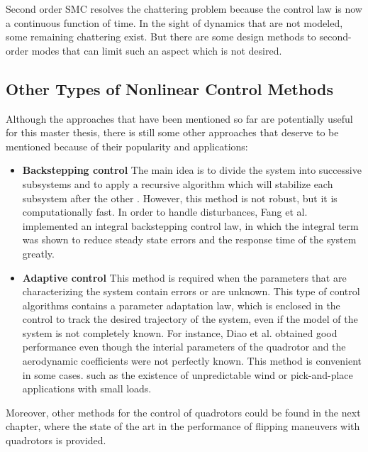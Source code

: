 \documentclass{thesisreport}
\begin{document}
\noindent Second order SMC resolves the chattering problem because the control law is now a continuous function of time. 
In the sight of dynamics that are not modeled, some remaining chattering exist. But there are some design methods to second-order modes that can limit such an aspect which is not desired.

\newpage

 \subsection{Other Types of Nonlinear Control Methods}
 
Although the approaches that have been mentioned so far are potentially useful for this master thesis, there is still some other approaches that deserve to be mentioned because of their popularity and applications:


\begin{itemize}
\setlength{\itemindent}{-.5in}
	\item [] \textbf{Backstepping control} The main idea is to divide the system into successive subsystems and to apply a recursive algorithm which will stabilize each subsystem after the other \cite{Madani2006}. However, this method is not robust, but it is computationally fast. In order to handle disturbances, Fang et al. \cite{Gao2011} implemented an integral backstepping control law, in which the integral term was shown to reduce steady state errors and the response time of the system greatly. 

	\item [] \textbf{Adaptive control} This method is required when the parameters that are characterizing the system contain errors or are unknown. This type of control algorithms contains a parameter adaptation law, which is enclosed in the control to track the desired trajectory of the system, even if the model of the system is not completely known.
For instance, Diao et al. \cite{Diao2011} obtained good performance even though the interial parameters of the quadrotor and the aerodynamic coefficients were not perfectly known.
This method is convenient in some cases. such as the existence of unpredictable wind \cite{Antonelli2013} or pick-and-place applications with small loads. 
	 
 \end{itemize}
 
\noindent Moreover, other methods for the control of quadrotors could be found  in the next chapter, where the state of the art in the performance of flipping maneuvers with quadrotors is provided. 
 
\end{document}
